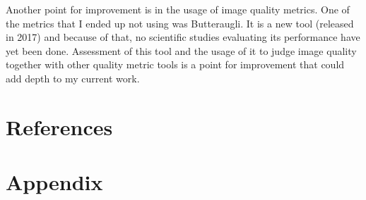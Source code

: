 \documentclass[12pt]{article}
\begin{document}
Another point for improvement is in the usage of image quality metrics. One of the metrics that I ended up not using was Butteraugli. It is a new tool (released in 2017) and because of that, no scientific studies evaluating its performance have yet been done. Assessment of this tool and the usage of it to judge image quality together with other quality metric tools is a point for improvement that could add depth to my current work.
\clearpage
\section{References}
{
\printbibliography[heading=none]
}
\clearpage
\section{Appendix}
\end{document}
